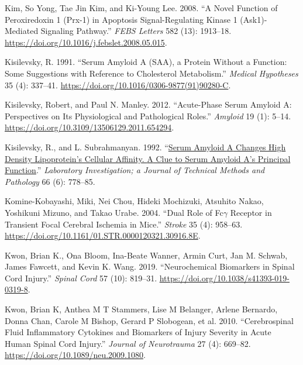 \documentclass[9pt,lineno]{elife}
\newlength{\cslhangindent}
\newlength{\cslentryspacingunit} %
\newenvironment{CSLReferences}[2] %
 {%
  \setlength{\parindent}{0pt}
  \ifodd #1
  \let\oldpar\par
  \def\par{\hangindent=\cslhangindent\oldpar}
  \fi
  \setlength{\parskip}{#2\cslentryspacingunit}
 }%
 {}
\begin{document}
\begin{CSLReferences}{1}{0}
\leavevmode{}%
Kim, So Yong, Tae Jin Kim, and Ki-Young Lee. 2008. {``A Novel Function of Peroxiredoxin 1 ({Prx-1}) in Apoptosis Signal-Regulating Kinase 1 ({Ask1})-Mediated Signaling Pathway.''} \emph{FEBS Letters} 582 (13): 1913--18. \url{https://doi.org/10.1016/j.febslet.2008.05.015}.

\leavevmode{}%
Kisilevsky, R. 1991. {``Serum Amyloid {A} ({SAA}), a Protein Without a Function: {Some} Suggestions with Reference to Cholesterol Metabolism.''} \emph{Medical Hypotheses} 35 (4): 337--41. \url{https://doi.org/10.1016/0306-9877(91)90280-C}.

\leavevmode{}%
Kisilevsky, Robert, and Paul N. Manley. 2012. {``Acute-Phase Serum Amyloid {A}: {Perspectives} on Its Physiological and Pathological Roles.''} \emph{Amyloid} 19 (1): 5--14. \url{https://doi.org/10.3109/13506129.2011.654294}.

\leavevmode{}%
Kisilevsky, R., and L. Subrahmanyan. 1992. {``\href{https://www.ncbi.nlm.nih.gov/pubmed/1602745}{Serum Amyloid {A} Changes High Density Lipoprotein's Cellular Affinity. {A} Clue to Serum Amyloid {A}'s Principal Function}.''} \emph{Laboratory Investigation; a Journal of Technical Methods and Pathology} 66 (6): 778--85.

\leavevmode{}%
Komine-Kobayashi, Miki, Nei Chou, Hideki Mochizuki, Atsuhito Nakao, Yoshikuni Mizuno, and Takao Urabe. 2004. {``Dual {Role} of {Fc\(\gamma\) Receptor} in {Transient Focal Cerebral Ischemia} in {Mice}.''} \emph{Stroke} 35 (4): 958--63. \url{https://doi.org/10.1161/01.STR.0000120321.30916.8E}.

\leavevmode{}%
Kwon, Brian K., Ona Bloom, Ina-Beate Wanner, Armin Curt, Jan M. Schwab, James Fawcett, and Kevin K. Wang. 2019. {``Neurochemical Biomarkers in Spinal Cord Injury.''} \emph{Spinal Cord} 57 (10): 819--31. \url{https://doi.org/10.1038/s41393-019-0319-8}.

\leavevmode{}%
Kwon, Brian K, Anthea M T Stammers, Lise M Belanger, Arlene Bernardo, Donna Chan, Carole M Bishop, Gerard P Slobogean, et al. 2010. {``Cerebrospinal Fluid Inflammatory Cytokines and Biomarkers of Injury Severity in Acute Human Spinal Cord Injury.''} \emph{Journal of Neurotrauma} 27 (4): 669--82. \url{https://doi.org/10.1089/neu.2009.1080}.


\end{CSLReferences}
\end{document}
